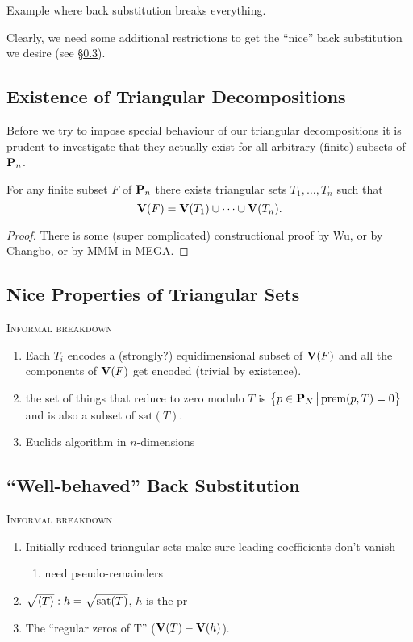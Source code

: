 \documentclass[12pt]{article}
\begin{document}
\begin{example}\label{Example::BadBackSubstition}
Example where back substitution breaks everything.
\end{example}

\noindent Clearly, we need some additional restrictions to get the ``nice'' back substitution we desire (see \S \ref{Section::BackSub}).

\subsection{Existence of Triangular Decompositions}
Before we try to impose special behaviour of our triangular decompositions it is prudent to investigate that they actually exist for all arbitrary (finite) subsets of $\mathbf{P}_n$. 

\begin{theorem}
For any finite subset $F$ of $\mathbf{P}_n$ there exists triangular sets $T_1, \ldots, T_n$ such that 
$$\mathbf{V}(F) = \mathbf{V}(T_1) \cup \cdots \cup \mathbf{V}(T_n).$$
\end{theorem}
\begin{proof}
There is some (super complicated) constructional proof by Wu, or by Changbo, or by MMM in MEGA.
\end{proof}

\subsection{Nice Properties of Triangular Sets}
\noindent\textsc{Informal breakdown}
\begin{enumerate}
\item Each $T_i$ encodes a (strongly?) equidimensional subset of $\mathbf{V}(F)$ and all the components of $\mathbf{V}(F)$ get encoded (trivial by existence).
\item the set of things that reduce to zero modulo $T$ is $\left\{ p \in \mathbf{P}_N \, \big{|} \, \text{prem}(p,T)=0 \right\}$ and is also a subset of $\text{sat}(T)$.
\item Euclids algorithm in $n$-dimensions
\end{enumerate}


\subsection{``Well-behaved'' Back Substitution}\label{Section::BackSub}
\noindent\textsc{Informal breakdown}
\begin{enumerate}
\item Initially reduced triangular sets make sure leading coefficients don't vanish
	\begin{enumerate}
		\item need pseudo-remainders
	\end{enumerate}
\item $\sqrt{\left< T \right>}:h = \sqrt{\text{sat}(T)}$, $h$ is the pr
\item The ``regular zeros of T'' ($\mathbf{V}(T) - \mathbf{V}(h)$).
\end{enumerate}
\end{document}
